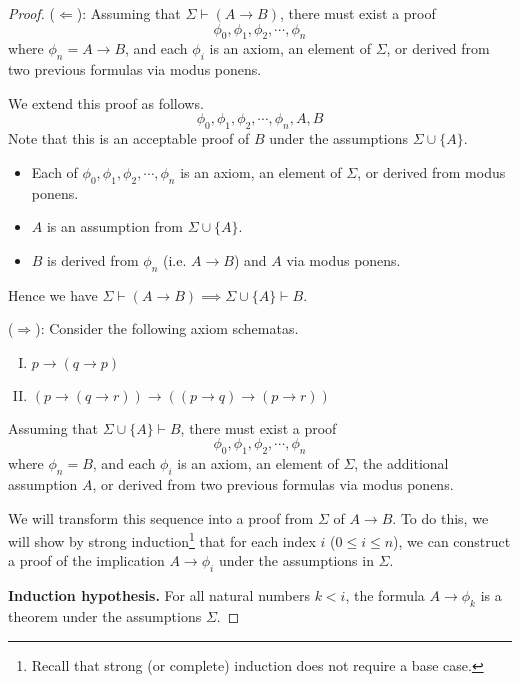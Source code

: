 \begin{proof}
    (\(\Leftarrow\)): Assuming that \(\Sigma\vdash(A\rightarrow B)\), there must exist a proof
    \[\phi_0, \phi_1, \phi_2, \cdots, \phi_n\]
    where \(\phi_n = A \rightarrow B\), and each \(\phi_i\) is an axiom, an element of \(\Sigma\), or derived from two previous formulas via modus ponens.

    We extend this proof as follows.
    \[\phi_0, \phi_1, \phi_2, \cdots, \phi_n, A, B\]
    Note that this is an acceptable proof of \(B\) under the assumptions \(\Sigma\cup\{A\}\).
    \begin{itemize}
        \item Each of \(\phi_0, \phi_1, \phi_2, \cdots, \phi_n\) is an axiom, an element of \(\Sigma\), or derived from modus ponens.
        \item \(A\) is an assumption from \(\Sigma\cup\{A\}\).
        \item \(B\) is derived from \(\phi_n\) (i.e. \(A \rightarrow B\)) and \(A\) via modus ponens.
    \end{itemize}
    Hence we have \(\Sigma\vdash(A\rightarrow B) \implies \Sigma\cup\{A\}\vdash B\).

    (\(\Rightarrow\)): Consider the following axiom schematas.
    \begin{enumerate}[I.]
        \item \(p\rightarrow(q\rightarrow p)\) \label{Ch07-deduction-thm-axiom-I}
        \item \((p \rightarrow (q \rightarrow r)) \rightarrow ((p \rightarrow q) \rightarrow (p \rightarrow r))\) \label{Ch07-deduction-thm-axiom-II}
    \end{enumerate}
    
    Assuming that \(\Sigma\cup\{A\}\vdash B\), there must exist a proof 
    \[\phi_0, \phi_1, \phi_2, \cdots, \phi_n\]
    where \(\phi_n = B\), and each \(\phi_i\) is an axiom, an element of \(\Sigma\), the additional assumption \(A\), or derived from two previous formulas via modus ponens.

    We will transform this sequence into a proof from \(\Sigma\) of \(A \rightarrow B\). To do this, we will show by strong induction\footnote{Recall that strong (or complete) induction does not require a base case.} that for each index \(i\) (\(0 \leq i \leq n\)), we can construct a proof of the implication \(A \rightarrow \phi_i\) under the assumptions in \(\Sigma\).

    \textbf{Induction hypothesis.} For all natural numbers \(k < i\), the formula \(A\rightarrow \phi_k\) is a theorem under the assumptions \(\Sigma\).


\end{proof}
